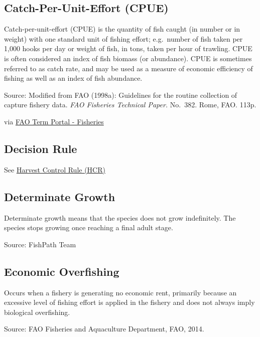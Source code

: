 \documentclass[
  11pt,
]{book}
\begin{document}
\hypertarget{catch-per-unit-effort-cpue}{%
\subsection{Catch-Per-Unit-Effort (CPUE)}\label{catch-per-unit-effort-cpue}}

Catch-per-unit-effort (CPUE) is the quantity of fish caught (in number or in weight) with one standard unit of fishing effort; e.g.~number of fish taken per 1,000 hooks per day or weight of fish, in tons, taken per hour of trawling. CPUE is often considered an index of fish biomass (or abundance). CPUE is sometimes referred to as catch rate, and may be used as a measure of economic efficiency of fishing as well as an index of fish abundance.

Source: Modified from FAO (1998a): Guidelines for the routine collection of capture fishery data. \emph{FAO Fisheries Technical Paper.} No.~382. Rome, FAO. 113p.

via \href{http://www.fao.org/fishery/glossary/en}{FAO Term Portal - Fisheries}

\hypertarget{decision-rule}{%
\subsection{Decision Rule}\label{decision-rule}}

See \protect\hyperlink{harvest-control-rule-hcr}{Harvest Control Rule (HCR)}

\hypertarget{determinate-growth}{%
\subsection{Determinate Growth}\label{determinate-growth}}

Determinate growth means that the species does not grow indefinitely. The species stops growing once reaching a final adult stage.

Source: FishPath Team

\hypertarget{economic-overfishing}{%
\subsection{Economic Overfishing}\label{economic-overfishing}}

Occurs when a fishery is generating no economic rent, primarily because an excessive level of fishing effort is applied in the fishery and does not always imply biological overfishing.

Source: FAO Fisheries and Aquaculture Department, FAO, 2014.
\end{document}
